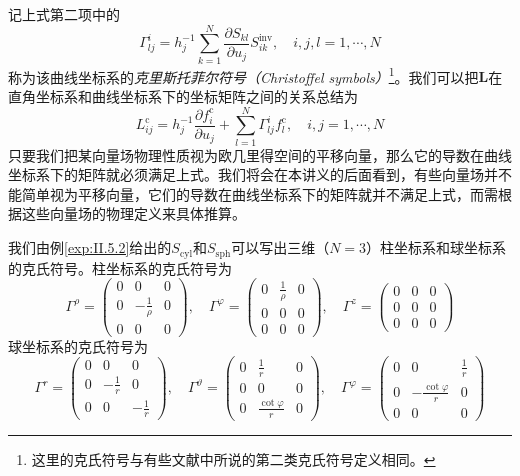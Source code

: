 \documentclass[../main.tex]{subfiles}
\begin{document}
记上式第二项中的
\[\Gamma_{lj}^i=h_j^{-1}\sum_{k=1}^N\frac{\partial S_{kl}}{\partial u_j}S_{ik}^\mathrm{inv},\quad i,j,l=1,\cdots,N\]
称为该曲线坐标系的\emph{克里斯托菲尔符号（Christoffel symbols）}\footnote{这里的克氏符号与有些文献中所说的第二类克氏符号定义相同。}。我们可以把$\mathbf{L}$在直角坐标系和曲线坐标系下的坐标矩阵之间的关系总结为
\[L_{ij}^\mathrm{c}=h_j^{-1}\frac{\partial f_i^\mathrm{c}}{\partial u_j}+\sum_{l=1}^N\Gamma_{lj}^if_l^\mathrm{c},\quad i,j=1,\cdots,N\]
只要我们把某向量场物理性质视为欧几里得空间的平移向量，那么它的导数在曲线坐标系下的矩阵就必须满足上式。我们将会在本讲义的后面看到，有些向量场并不能简单视为平移向量，它们的导数在曲线坐标系下的矩阵就并不满足上式，而需根据这些向量场的物理定义来具体推算。

\begin{example}[柱坐标系和球坐标系的克氏符号]\label{exp:II.5.3}
    我们由例\ref{exp:II.5.2}给出的$S_\mathrm{cyl}$和$S_\mathrm{sph}$可以写出三维（$N=3$）柱坐标系和球坐标系的克氏符号。柱坐标系的克氏符号为
    \[
        \Gamma^\rho     =\left(\begin{array}{ccc}0&0&0\\0&-\frac{1}{\rho}&0\\0&0&0\end{array}\right),\quad
        \Gamma^\varphi  =\left(\begin{array}{ccc}0&\frac{1}{\rho}&0\\0&0&0\\0&0&0\end{array}\right),\quad
        \Gamma^z        =\left(\begin{array}{ccc}0&0&0\\0&0&0\\0&0&0\end{array}\right)
    \]
    球坐标系的克氏符号为
    \[
        \Gamma^r         =\left(\begin{array}{ccc}0&0&0\\0&-\frac{1}{r}&0\\0&0&-\frac{1}{r}\end{array}\right)   ,\quad
        \Gamma^\vartheta  =\left(\begin{array}{ccc}0&\frac{1}{r}&0\\0&0&0\\0&\frac{\cot\varphi}{r}&0\end{array}\right)  ,\quad
        \Gamma^\varphi    =\left(\begin{array}{ccc}0&0&\frac{1}{r}\\0&-\frac{\cot\varphi}{r}&0\\0&0&0\end{array}\right)
    \]
\end{example}
\end{document}
